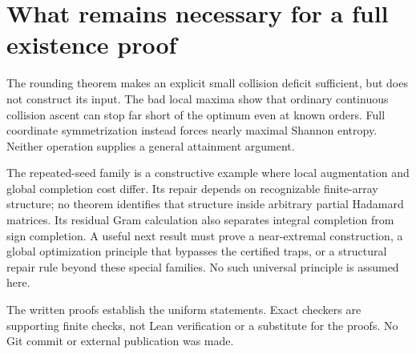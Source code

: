 \documentclass[11pt]{article}
\begin{document}
\section{What remains necessary for a full existence proof}
The rounding theorem makes an explicit small collision deficit
sufficient, but does not construct its input. The bad local maxima
show that ordinary continuous collision ascent can stop far short of
the optimum even at known orders. Full coordinate symmetrization
instead forces nearly maximal Shannon entropy. Neither operation
supplies a general attainment argument.

The repeated-seed family is a constructive example where local
augmentation and global completion cost differ. Its repair depends
on recognizable finite-array structure; no theorem identifies that
structure inside arbitrary partial Hadamard matrices. Its residual
Gram calculation also separates integral completion from sign
completion. A useful next result must prove a near-extremal
construction, a global optimization principle that bypasses the
certified traps, or a structural repair rule beyond these special
families. No such universal principle is assumed here.

The written proofs establish the uniform statements. Exact checkers
are supporting finite checks, not Lean verification or a substitute
for the proofs. No Git commit or external publication was made.
\end{document}
